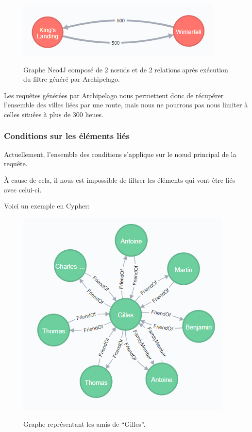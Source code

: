 \documentclass[a4paper,fleqn,12pt,oneside]{book}
\begin{document}
\begin{figure}[!ht]
\centering
\includegraphics[scale=0.8]{figures/citiesRelFilt.png}
\label{fig:citiesRelFilt}
\caption{Graphe Neo4J composé de 2 nœuds et de 2 relations après exécution du filtre généré par Archipelago.}
\end{figure}

Les requêtes générées par Archipelago nous permettent donc de récupérer l'ensemble des villes liées par une route, mais nous ne pourrons pas nous limiter à celles situées à plus de 300 lieues.
\newpage
\subsubsection*{\bf Conditions sur les éléments liés}

Actuellement, l'ensemble des conditions s'applique sur le nœud principal de la requête.

\`A cause de cela, il nous est impossible de filtrer les éléments qui vont être liés avec celui-ci. 

Voici un exemple en Cypher:

\begin{figure}[!ht]
\centering
\includegraphics[scale=1]{figures/friendOf.png}
\label{fig:friendOf}
\caption{Graphe représentant les amis de \enquote{Gilles}.}
\end{figure}
 
\end{document}
